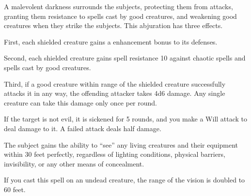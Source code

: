 \begin{comment}
\subsubsection{U-Z}
\end{comment}

\begin{spelleffect}
  A malevolent darkness surrounds the subjects, protecting them from attacks, granting them resistance to spells cast by good creatures, and weakening good creatures when they strike the subjects. This abjuration has three effects.
  \par First, each shielded creature gains a  enhancement bonus to its defenses.
  \par Second, each shielded creature gains spell resistance 10 against chaotic spells and spells cast by good creatures.
  \par Third, if a good creature within \rngmed range of the shielded creature successfully attacks it in any way, the offending attacker takes 4d6 damage. Any single creature can take this damage only once per round.
\end{spelleffect}

\spellrng{\rngmed}
\begin{spelleffect}
    If the target is not evil, it is sickened for 5 rounds, and you make a Will attack to deal damage to it. A failed attack deals half damage.
\end{spelleffect}

\begin{spelleffect}
  The subject gains the ability to ``see'' any living creatures and their equipment within 30 feet perfectly, regardless of lighting conditions, physical barriers, invisibility, or any other means of concealment.

  If you cast this spell on an undead creature, the range of the vision is doubled to 60 feet.
\end{spelleffect}

